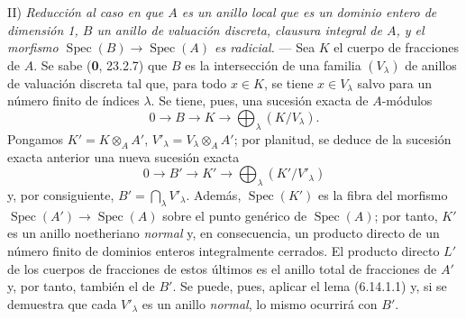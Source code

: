 II) \emph{Reducción al caso en que $A$ es un anillo local que es un dominio
entero de dimensión 1, $B$ un anillo de valuación discreta, clausura
integral de $A$, y el morfismo
$\operatorname{Spec}(B)\to\operatorname{Spec}(A)$ es radicial.} ---
Sea $K$ el cuerpo de fracciones de $A$. Se sabe (\textbf 0, 23.2.7) que $B$
es la intersección de una familia $(V_\lambda)$ de anillos de
valuación discreta tal que, para todo $x\in K$, se tiene
$x\in V_\lambda$ salvo para un número finito de índices $\lambda$.
Se tiene, pues, una sucesión exacta de $A$-módulos
\[
0\longrightarrow B\longrightarrow K\longrightarrow
\bigoplus_\lambda(K/V_\lambda).
\]
Pongamos $K'=K\otimes_A A'$, $V'_\lambda=V_\lambda\otimes_A A'$;
por planitud, se deduce de la sucesión exacta anterior una nueva
sucesión exacta
\[
0\longrightarrow B'\longrightarrow K'\longrightarrow
\bigoplus_\lambda(K'/V'_\lambda)
\]
y, por consiguiente, $B'=\bigcap_\lambda V'_\lambda$. Además,
$\operatorname{Spec}(K')$ es la fibra del morfismo
$\operatorname{Spec}(A')\to\operatorname{Spec}(A)$ sobre el punto
genérico de $\operatorname{Spec}(A)$; por tanto, $K'$ es un anillo
noetheriano \emph{normal} y, en consecuencia, un producto directo de un
número finito de dominios enteros integralmente cerrados. El producto
directo $L'$ de los cuerpos de fracciones de estos últimos es el
anillo total de fracciones de $A'$ y, por tanto, también el de $B'$.
Se puede, pues, aplicar el lema (6.14.1.1) y, si se demuestra que cada
$V'_\lambda$ es un anillo \emph{normal}, lo mismo ocurrirá con $B'$.
